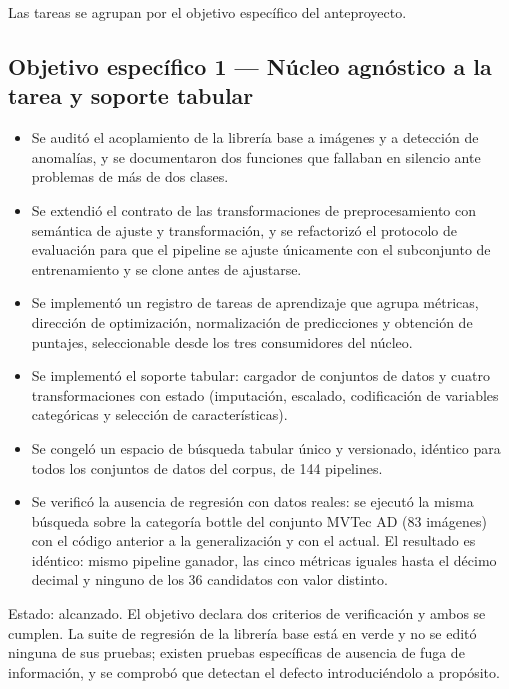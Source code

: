 \documentclass[11pt,letterpaper]{article}
\begin{document}
Las tareas se agrupan por el objetivo específico del anteproyecto.

\subsection{Objetivo específico 1 --- Núcleo agnóstico a la tarea y soporte tabular}

\begin{itemize}
  \item Se auditó el acoplamiento de la librería base a imágenes y a detección de
        anomalías, y se documentaron dos funciones que fallaban en silencio ante
        problemas de más de dos clases.
  \item Se extendió el contrato de las transformaciones de preprocesamiento con
        semántica de ajuste y transformación, y se refactorizó el protocolo de
        evaluación para que el pipeline se ajuste únicamente con el subconjunto de
        entrenamiento y se clone antes de ajustarse.
  \item Se implementó un registro de tareas de aprendizaje que agrupa métricas,
        dirección de optimización, normalización de predicciones y obtención de
        puntajes, seleccionable desde los tres consumidores del núcleo.
  \item Se implementó el soporte tabular: cargador de conjuntos de datos y cuatro
        transformaciones con estado (imputación, escalado, codificación de
        variables categóricas y selección de características).
  \item Se congeló un espacio de búsqueda tabular único y versionado, idéntico
        para todos los conjuntos de datos del corpus, de 144 pipelines.
  \item Se verificó la ausencia de regresión con datos reales: se ejecutó la misma
        búsqueda sobre la categoría bottle del conjunto MVTec AD (83 imágenes) con
        el código anterior a la generalización y con el actual. El resultado es
        idéntico: mismo pipeline ganador, las cinco métricas iguales hasta el
        décimo decimal y ninguno de los 36 candidatos con valor distinto.
\end{itemize}

Estado: alcanzado. El objetivo declara dos criterios de verificación y ambos se
cumplen. La suite de regresión de la librería base está en verde y no se editó
ninguna de sus pruebas; existen pruebas específicas de ausencia de fuga de
información, y se comprobó que detectan el defecto introduciéndolo a propósito.
\end{document}

